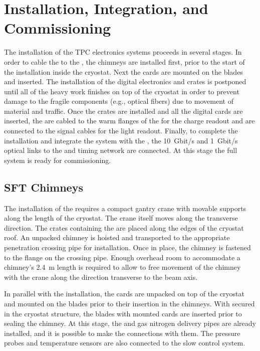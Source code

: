 \section{Installation, Integration, and Commissioning}
\label{sec:dp-tpcelec-install}

The installation of the TPC electronics systems proceeds in several stages. In order to cable the  to the , the chimneys are installed first, prior to the start of the  installation inside the cryostat. Next the  cards are mounted on the blades and inserted. The installation of the digital electronics and  crates is postponed until all of the heavy work finishes on top of the cryostat in order to prevent damage to the fragile components (e.g., optical fibers) due to movement of material and traffic. 
Once the  crates are installed and all the digital cards are inserted, the  are cabled to the warm flanges of the  for the charge readout and are connected to the  signal cables for the light readout. Finally, to complete the installation and integrate the system with the , the \SI{10}{Gbit/s} and \SI{1}{Gbit/s} optical links to the  and  timing network are connected. At this stage the full system is ready for commissioning. 

\subsection{SFT Chimneys}
\label{sec:dp-tpcelec-install-sft}

The installation of the  requires a compact gantry crane with movable supports along the length of the cryostat. The crane itself moves along the transverse direction. The crates containing the  are placed along the edges of the cryostat roof. An unpacked chimney is hoisted and transported to the appropriate penetration crossing pipe for installation. Once in place, the chimney is fastened to the flange on the crossing pipe. Enough overhead room to accommodate a chimney's \SI{2.4}{m} length is required to allow to free movement of the chimney with the crane along the direction transverse to the beam axis. 

In parallel with the  installation, the  cards are unpacked on top of the cryostat and mounted on the blades prior to their insertion in the chimneys. With  secured in the cryostat structure, the blades with mounted  cards are inserted prior to sealing the chimney. At this stage, the \lar and gas nitrogen delivery pipes are already installed, and it is possible to make the connections with them. The pressure probes and temperature sensors are also connected to the slow control system.

